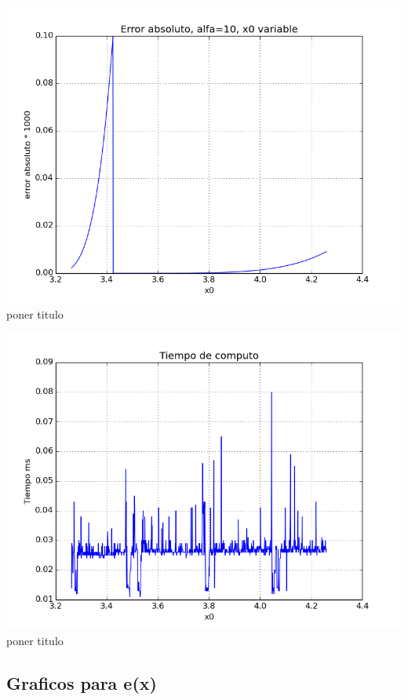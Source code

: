 \begin{center}
\includegraphics[scale=0.5]{graficos/x0s-f-newton-alfa_fijo-absoluto-0.0001-alejando_cercano.png}\\
poner titulo
\end{center}

\begin{center}
\includegraphics[scale=0.5]{graficos/tiempo-f-newton-alfa_fijo-absoluto-0.0001-alejando_cercano.png}\\
poner titulo
\end{center}

\subsection{Graficos para e(x)}


